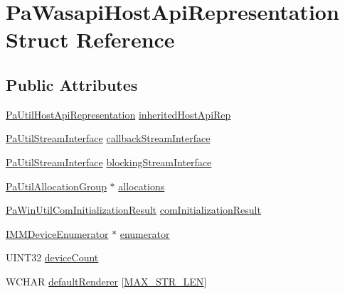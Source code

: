 \hypertarget{struct_pa_wasapi_host_api_representation}{}\section{Pa\+Wasapi\+Host\+Api\+Representation Struct Reference}
\label{struct_pa_wasapi_host_api_representation}
\subsection*{Public Attributes}
\begin{DoxyCompactItemize}
\item 
\hyperlink{struct_pa_util_host_api_representation}{Pa\+Util\+Host\+Api\+Representation} \hyperlink{struct_pa_wasapi_host_api_representation_ad447d8ee0d61618450521f7d8204b733}{inherited\+Host\+Api\+Rep}
\item 
\hyperlink{struct_pa_util_stream_interface}{Pa\+Util\+Stream\+Interface} \hyperlink{struct_pa_wasapi_host_api_representation_ab0a50b8957abc26a47c113ed33311a53}{callback\+Stream\+Interface}
\item 
\hyperlink{struct_pa_util_stream_interface}{Pa\+Util\+Stream\+Interface} \hyperlink{struct_pa_wasapi_host_api_representation_ace80cce61f9d475d6c4f2af80cb2933d}{blocking\+Stream\+Interface}
\item 
\hyperlink{struct_pa_util_allocation_group}{Pa\+Util\+Allocation\+Group} $\ast$ \hyperlink{struct_pa_wasapi_host_api_representation_a618f5cbefb32d51edcda7dd12905ddf2}{allocations}
\item 
\hyperlink{struct_pa_win_util_com_initialization_result}{Pa\+Win\+Util\+Com\+Initialization\+Result} \hyperlink{struct_pa_wasapi_host_api_representation_aaaf9e88d3972658267845c5df3f1bd2b}{com\+Initialization\+Result}
\item 
\hyperlink{mmdeviceapi_8h_a105bf1359b5d6cd4fb24828cc6ab2874}{I\+M\+M\+Device\+Enumerator} $\ast$ \hyperlink{struct_pa_wasapi_host_api_representation_a550fc0e31be4a4f1013f921b18469fb8}{enumerator}
\item 
U\+I\+N\+T32 \hyperlink{struct_pa_wasapi_host_api_representation_aa1e79d8886b9e0a504e3d3501b9bea18}{device\+Count}
\item 
W\+C\+H\+AR \hyperlink{struct_pa_wasapi_host_api_representation_a97f7bb4e7ccaab5658d3f2e339de7e4a}{default\+Renderer} \mbox{[}\hyperlink{pa__win__wasapi_8c_a58ce36916c399104e18d32ff090f21c6}{M\+A\+X\+\_\+\+S\+T\+R\+\_\+\+L\+EN}\mbox{]}
\item 

\end{DoxyCompactItemize}
